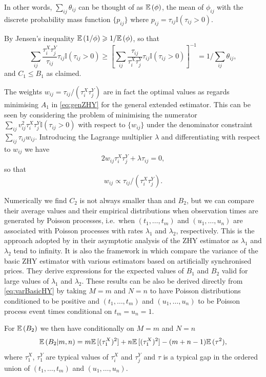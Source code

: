 In other words, $\sum_{ij}\theta_{ij}$ can be thought of as $\mathbb{E}\,(\phi)$, the mean of $\phi_{ij}$ with the discrete probability mass function $\{p_{ij}\}$ where $p_{ij} = \tau_{ij} \mathbb{I}(\tau_{ij} > 0)$. 

By Jensen's inequality $\mathbb{E}\,(1/\phi) \geqslant 1/\mathbb{E}\,(\phi)$, so that
$$\sum_{ij} \frac{\tau_i^X \tau_j^Y}{\tau_{ij}} \tau_{ij} \mathbb{I}(\tau_{ij} > 0) \geqslant \left[
\sum_{ij} \frac{\tau_{ij}}{\tau_i^X \tau_j^Y} \tau_{ij} \mathbb{I}(\tau_{ij} > 0)\right]^{-1} = 1/\sum_{ij} \theta_{ij},$$
and $C_1 \leqslant B_1$ as claimed. 

The weights $w_{ij} = \tau_{ij}/(\tau^X_i \tau^Y_j)$ are in fact the optimal values as regards minimising $A_1$ in \eqref{eq:genZHY} for the general extended estimator.  This can be seen by considering the problem of minimising the numerator $ \sum_{ij} v^2_{ij} \tau^X_i \tau^Y_j \mathbb{I}(\tau_{ij}>0)$ with respect to $\{w_{ij}\}$ under the denominator constraint $\sum_{ij} \tau_{ij} w_{ij}$.  Introducing the Lagrange multiplier $\lambda$ and differentiating with respect to $w_{ij}$ we have
$$2 w_{ij} \tau^X_i \tau^Y_j + \lambda \tau_{ij} = 0,$$ so that
$$ w_{ij} \propto \tau_{ij} /(\tau^X_i \tau^Y_j).$$ 

Numerically we find $C_2$ is not always smaller than and $B_2$, but we can compare their average values and their empirical distributions when observation times are generated by Poisson processes, i.e.\ when $(t_1,\dots, t_m)$ and $(u_1, \dots, u_n)$ are associated with Poisson processes with rates $\lambda_1$ and $\lambda_2$, respectively.  
This is the approach adopted by \citet{hayashi2008asymptotic} in their asymptotic analysis of the ZHY estimator as $\lambda_1$ and $\lambda_2$ tend to infinity.  It is also the framework in which \citet{griffin2011covariance} compare the variance of the basic ZHY estimator with various estimators based on artificially synchronised prices. They derive expressions for the expected values of $B_1$ and $B_2$ valid for large values of $\lambda_1$ and $\lambda_2$.  These results can be also be derived directly from \eqref{eq:varBasicHY} by taking $M=m$ and $N=n$ to have Poisson distributions conditioned to be positive and $(t_1,\dots, t_{m})$ and $(u_1, \dots, u_{n})$  to be Poisson process event times conditional on $t_m = u_n  = 1$. 

For $\mathbb{E}\,(B_2)$ we then have conditionally on $M=m$ and $N=n$
$$ \mathbb{E}\,(B_2| m,n) = m \mathbb{E}\,[(\tau_1^X)^2] + n \mathbb{E}\,[(\tau^X_1)^2] - (m+n-1)\mathbb{E}\,(\tau^2),$$
where $\tau_1^X$, $\tau_1^Y$ are typical values of $\tau_i^X$ and $\tau_j^Y$ and $\tau$ is a typical gap in the ordered union of $(t_1,\dots, t_m)$ and $(u_1, \dots, u_n)$.  

